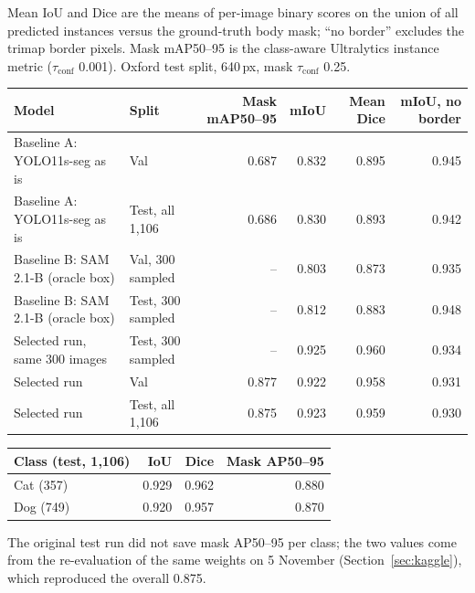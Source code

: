 \documentclass[11pt,a4paper]{article}
\newcommand{\tconf}{$\tau_{\text{conf}}$}
\begin{document}
Mean IoU and Dice are the means of per-image binary scores on the union of all predicted instances versus the ground-truth body mask; ``no border'' excludes the trimap border pixels. Mask mAP50--95 is the class-aware Ultralytics instance metric (\tconf{} 0.001). Oxford test split, 640\,px, mask \tconf{} 0.25.

{\small
\begin{tabularx}{\linewidth}{@{}Y l r r r r@{}}
\toprule
Model & Split & Mask mAP50--95 & mIoU & Mean Dice & mIoU, no border \\
\midrule
Baseline A: YOLO11s-seg as is & Val & 0.687 & 0.832 & 0.895 & 0.945 \\
Baseline A: YOLO11s-seg as is & Test, all 1,106 & 0.686 & 0.830 & 0.893 & 0.942 \\
Baseline B: SAM 2.1-B (oracle box) & Val, 300 sampled & -- & 0.803 & 0.873 & 0.935 \\
Baseline B: SAM 2.1-B (oracle box) & Test, 300 sampled & -- & 0.812 & 0.883 & 0.948 \\
Selected run, same 300 images & Test, 300 sampled & -- & 0.925 & 0.960 & 0.934 \\
Selected run & Val & 0.877 & 0.922 & 0.958 & 0.931 \\
Selected run & Test, all 1,106 & 0.875 & 0.923 & 0.959 & 0.930 \\
\bottomrule
\end{tabularx}}

\medskip
\begin{tabularx}{\linewidth}{@{}Y r r r@{}}
\toprule
Class (test, 1,106) & IoU & Dice & Mask AP50--95 \\
\midrule
Cat (357) & 0.929 & 0.962 & 0.880 \\
Dog (749) & 0.920 & 0.957 & 0.870 \\
\bottomrule
\end{tabularx}

\smallskip
The original test run did not save mask AP50--95 per class; the two values come from the re-evaluation of the same weights on 5 November (Section~\ref{sec:kaggle}), which reproduced the overall 0.875.
\end{document}

